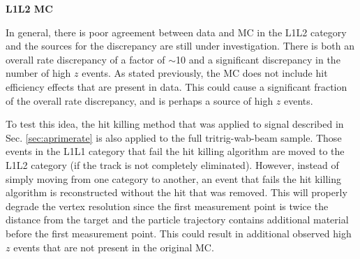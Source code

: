 
\clearpage

\textbf{L1L2 MC}

In general, there is poor agreement between data and MC in the L1L2 category and the sources for the discrepancy are still under investigation. There is both an overall rate discrepancy of a factor of $\sim$10 and a significant discrepancy in the number of high $z$ events. As stated previously, the MC does not include hit efficiency effects that are present in data. This could cause a significant fraction of the overall rate discrepancy, and is perhaps a source of high $z$ events.

To test this idea, the hit killing method that was applied to signal described in Sec. \ref{sec:aprimerate} is also applied to the full tritrig-wab-beam sample. Those events in the L1L1 category that fail the hit killing algorithm are moved to the L1L2 category (if the track is not completely eliminated). However, instead of simply moving from one category to another, an event that fails the hit killing algorithm is reconstructed without the hit that was removed. This will properly degrade the vertex resolution since the first measurement point is twice the distance from the target and the particle trajectory contains additional material before the first measurement point. This could result in additional observed high $z$ events that are not present in the original MC.

